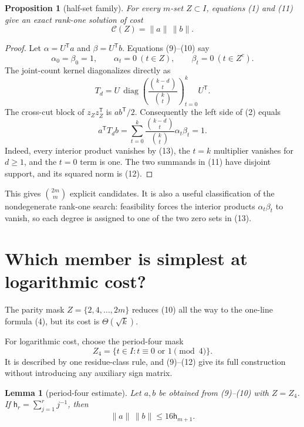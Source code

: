 \documentclass[11pt]{article}
\newcommand{\1}{\mathbf 1}
\newcommand{\norm}[1]{\lVert#1\rVert}
\newtheorem{lemma}[theorem]{Lemma}
\newtheorem{proposition}[theorem]{Proposition}
\begin{document}
\begin{proposition}[half-set family]
For every $m$-set $Z\subset I$, equations (1) and (11) give an exact
rank-one solution of cost
\begin{equation}
 \mathcal C(Z)=\norm a\,\norm b.                         \tag{12}
\end{equation}
\end{proposition}

\begin{proof}
Let $\alpha=U^{\mathsf T}a$ and $\beta=U^{\mathsf T}b$.
Equations (9)--(10) say
\[
 \alpha_0=\beta_0=1,\qquad \alpha_t=0\ (t\in Z),
 \qquad \beta_t=0\ (t\in Z^c).                        \tag{13}
\]
The joint-count kernel diagonalizes directly as
\[
 T_d=U\,\operatorname{diag}\left(
       \frac{\binom{k-d}{t}}{\binom{k}{t}}
     \right)_{t=0}^{k}U^{\mathsf T}.                    \tag{14}
\]
The cross-cut block of $z_Zz_Z^{\mathsf T}$ is $ab^{\mathsf T}/2$.
Consequently the left side of (2) equals
\[
 a^{\mathsf T}T_db
 =\sum_{t=0}^k\frac{\binom{k-d}{t}}{\binom{k}{t}}
                   \alpha_t\beta_t=1.                  \tag{15}
\]
Indeed, every interior product vanishes by (13), the $t=k$ multiplier
vanishes for $d\ge1$, and the $t=0$ term is one.  The two summands in
(11) have disjoint support, and its squared norm is (12).
\end{proof}

This gives $\binom{2m}{m}$ explicit candidates.  It is also a useful
classification of the nondegenerate rank-one search: feasibility forces
the interior products $\alpha_t\beta_t$ to vanish, so each degree is
assigned to one of the two zero sets in (13).

\section{Which member is simplest at logarithmic cost?}

The parity mask $Z=\{2,4,\ldots,2m\}$ reduces (10) all the way to the
one-line formula (4), but its cost is $\Theta(\sqrt{k})$.

For logarithmic cost, choose the period-four mask
\begin{equation}
 Z_4=\{t\in I:t\equiv0\text{ or }1\pmod4\}.             \tag{16}
\end{equation}
It is described by one residue-class rule, and (9)--(12) give its full
construction without introducing any auxiliary sign matrix.

\begin{lemma}[period-four estimate]
Let $a,b$ be obtained from (9)--(10) with $Z=Z_4$.  If
$\mathsf h_r=\sum_{j=1}^rj^{-1}$, then
\begin{equation}
 \norm a\,\norm b\le16\mathsf h_{m+1}.                 \tag{17}
\end{equation}
\end{lemma}
\end{document}
